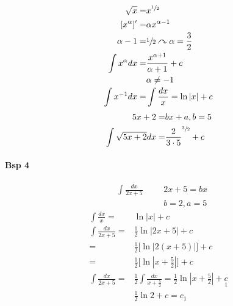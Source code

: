 \documentclass{article}
\begin{document}
\begin{align*}
	\sqrt{x} =& x^{\sfrac{1}{2}}
	\\
	[x^{\alpha}]' =& \alpha x^{\alpha - 1}
	\\
	\alpha - 1 =& \sfrac{1}{2} \curvearrowright \alpha = \frac{3}{2}
	\\
	\int x^{\alpha}dx =& \frac{x^{\alpha+1}}{\alpha+1}+c
	\\
	& \alpha \neq -1
	\\
	\int x^{-1}dx =& \int \frac{dx}{x} = \ln{|x|} + c	
\end{align*}
\begin{align*}
	5x + 2 =& bx + a, b=5
	\\
	\int \sqrt{5x + 2} dx =& \frac{2}{3 \cdot 5}^{\sfrac{3}{2}} + c
\end{align*}
\paragraph{Bsp 4}
\begin{align*}
	&\int \frac{dx}{2x+5}& && 2x + 5 = bx
	\\
	& & && b = 2, a = 5
\end{align*}
\begin{align*}
	\int \frac{dx}{x} =& \ln{|x|} + c
	\\
	\int \frac{dx}{2x+5} =& \frac{1}{2}\ln{|2x+5|} + c
	\\
	=& \frac{1}{2} \bigg[\ln{|2(x+5)|}\bigg]+c
	\\
	=& \frac{1}{2} \bigg[\ln{|x+\frac{5}{2}|}\bigg]+c
	\\
	\int \frac{dx}{2x+5}=&\frac{1}{2} \int \frac{dx}{x+\frac{5}{2}} = \frac{1}{2}
	\ln{|x+ \frac{5}{2}|+\underset{1}{c}}
	\\
	&\frac{1}{2} \ln{2}+c = c_1 
\end{align*}
\end{document}

